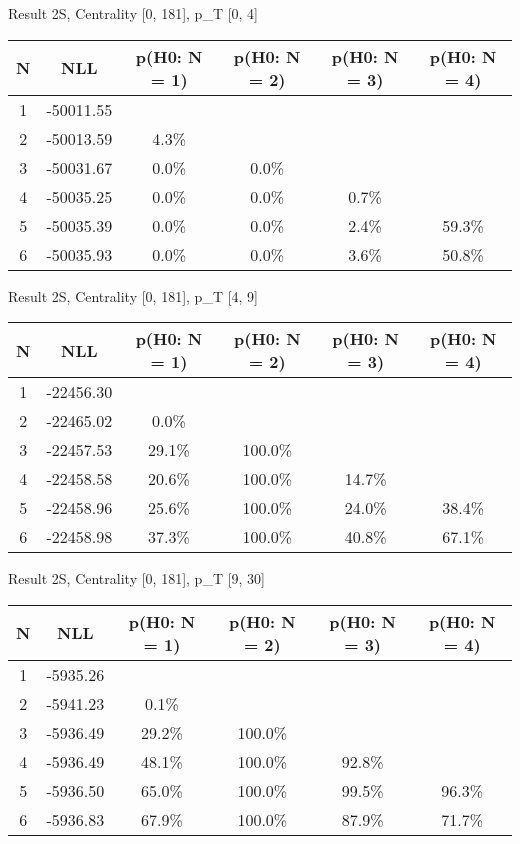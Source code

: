 Result 2S, Centrality [0, 181], p_{T} [0, 4]
\begin{table}[h!]
	\centering
	\begin{tabular}{cc||cccc}
		N & NLL & p(H0: N = 1) & p(H0: N = 2) & p(H0: N = 3) & p(H0: N = 4)\\ 
		\hline
1 & -50011.55 & & & & \\
2 & -50013.59 & 4.3\% & & & \\
3 & -50031.67 & 0.0\% & 0.0\% & & \\
4 & -50035.25 & 0.0\% & 0.0\% & 0.7\% & \\
5 & -50035.39 & 0.0\% & 0.0\% & 2.4\% & 59.3\% \\
6 & -50035.93 & 0.0\% & 0.0\% & 3.6\% & 50.8\% \\
	\end{tabular}
	\label{tab:lab}
\end{table}

Result 2S, Centrality [0, 181], p_{T} [4, 9]
\begin{table}[h!]
	\centering
	\begin{tabular}{cc||cccc}
		N & NLL & p(H0: N = 1) & p(H0: N = 2) & p(H0: N = 3) & p(H0: N = 4)\\ 
		\hline
1 & -22456.30 & & & & \\
2 & -22465.02 & 0.0\% & & & \\
3 & -22457.53 & 29.1\% & 100.0\% & & \\
4 & -22458.58 & 20.6\% & 100.0\% & 14.7\% & \\
5 & -22458.96 & 25.6\% & 100.0\% & 24.0\% & 38.4\% \\
6 & -22458.98 & 37.3\% & 100.0\% & 40.8\% & 67.1\% \\
	\end{tabular}
	\label{tab:lab}
\end{table}

Result 2S, Centrality [0, 181], p_{T} [9, 30]
\begin{table}[h!]
	\centering
	\begin{tabular}{cc||cccc}
		N & NLL & p(H0: N = 1) & p(H0: N = 2) & p(H0: N = 3) & p(H0: N = 4)\\ 
		\hline
1 & -5935.26 & & & & \\
2 & -5941.23 & 0.1\% & & & \\
3 & -5936.49 & 29.2\% & 100.0\% & & \\
4 & -5936.49 & 48.1\% & 100.0\% & 92.8\% & \\
5 & -5936.50 & 65.0\% & 100.0\% & 99.5\% & 96.3\% \\
6 & -5936.83 & 67.9\% & 100.0\% & 87.9\% & 71.7\% \\
	\end{tabular}
	\label{tab:lab}
\end{table}

